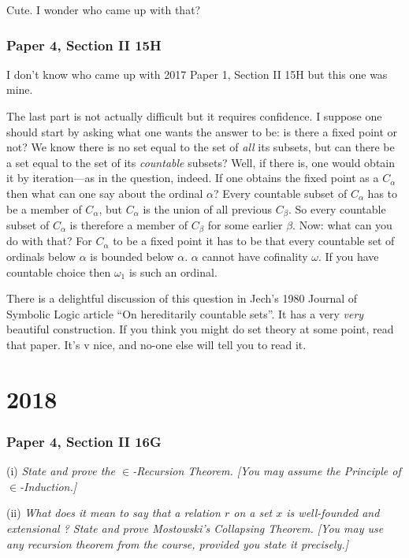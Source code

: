\documentclass{book}
\begin{document}
\medskip

Cute.  I wonder who came up with that?

\subsection*{Paper 4, Section II 15H}

I don't know who came up with {2017 Paper 1, Section II 15H} but this one was mine.

\smallskip

The last part is not actually difficult but it requires confidence.  I
suppose one should start by asking what one wants the answer to be: is
there a fixed point or not?  We know there is no set equal to the set
of {\sl all} its subsets, but can there be a set equal to the set of
its {\sl countable} subsets?  Well, if there is, one would obtain it
by iteration---as in the question, indeed.  If one obtains the fixed
point as a $C_\alpha$ then what can one say about the ordinal
$\alpha$?  Every countable subset of $C_\alpha$ has to be a member of
$C_\alpha$, but $C_\alpha$ is the union of all previous $C_\beta$.  So
every countable subset of $C_\alpha$ is therefore a member of
$C_\beta$ for some earlier $\beta$.  Now: what can you do with that?
For $C_\alpha$ to be a fixed point it has to be that every countable
set of ordinals below $\alpha$ is bounded below $\alpha$.  $\alpha$
cannot have cofinality $\omega$.  If you have countable choice then
$\omega_1$ is such an ordinal.

There is a delightful discussion of this question in Jech's 1980
Journal of Symbolic Logic article ``On hereditarily countable sets''.
It has a very {\sl very} beautiful construction.  If you think you
might do set theory at some point, read that paper.  It's v nice, and
no-one else will tell you to read it.


\chapter{2018}
\subsection*{Paper 4, Section II 16G}
(i) {\sl State and prove the $\in$-Recursion Theorem.  [You may assume the
    Principle of $\in$-Induction.]}

\smallskip

\noindent (ii) {\sl What does it mean to say that a relation $r$ on a set $x$ is
  well-founded and extensional ?  State and prove Mostowski's
  Collapsing Theorem.  [You may use any recursion theorem from
    the course, provided you state it precisely.]}
\end{document}
